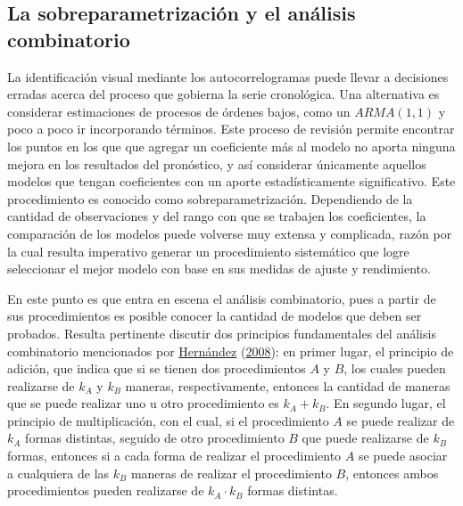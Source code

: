\documentclass[
]{article}
\begin{document}
\subsection{La sobreparametrización y el análisis combinatorio}

La identificación visual mediante los autocorrelogramas puede llevar a
decisiones erradas acerca del proceso que gobierna la serie cronológica.
Una alternativa es considerar estimaciones de procesos de órdenes bajos,
como un \(ARMA(1,1)\) y poco a poco ir incorporando términos. Este
proceso de revisión permite encontrar los puntos en los que que agregar
un coeficiente más al modelo no aporta ninguna mejora en los resultados
del pronóstico, y así considerar únicamente aquellos modelos que tengan
coeficientes con un aporte estadísticamente significativo. Este
procedimiento es conocido como sobreparametrización. Dependiendo de la
cantidad de observaciones y del rango con que se trabajen los
coeficientes, la comparación de los modelos puede volverse muy extensa y
complicada, razón por la cual resulta imperativo generar un
procedimiento sistemático que logre seleccionar el mejor modelo con base
en sus medidas de ajuste y rendimiento.

En este punto es que entra en escena el análisis combinatorio, pues a
partir de sus procedimientos es posible conocer la cantidad de modelos
que deben ser probados. Resulta pertinente discutir dos principios
fundamentales del análisis combinatorio mencionados por
\protect\hyperlink{ref-analisis_combinatorio}{Hernández}
(\protect\hyperlink{ref-analisis_combinatorio}{2008}): en primer lugar,
el principio de adición, que indica que si se tienen dos procedimientos
\(A\) y \(B\), los cuales pueden realizarse de \(k_A\) y \(k_B\)
maneras, respectivamente, entonces la cantidad de maneras que se puede
realizar uno u otro procedimiento es \(k_A + k_B\). En segundo lugar, el
principio de multiplicación, con el cual, si el procedimiento \(A\) se
puede realizar de \(k_A\) formas distintas, seguido de otro
procedimiento \(B\) que puede realizarse de \(k_B\) formas, entonces si
a cada forma de realizar el procedimiento \(A\) se puede asociar a
cualquiera de las \(k_B\) maneras de realizar el procedimiento \(B\),
entonces ambos procedimientos pueden realizarse de \(k_A \cdot k_B\)
formas distintas.
\end{document}
